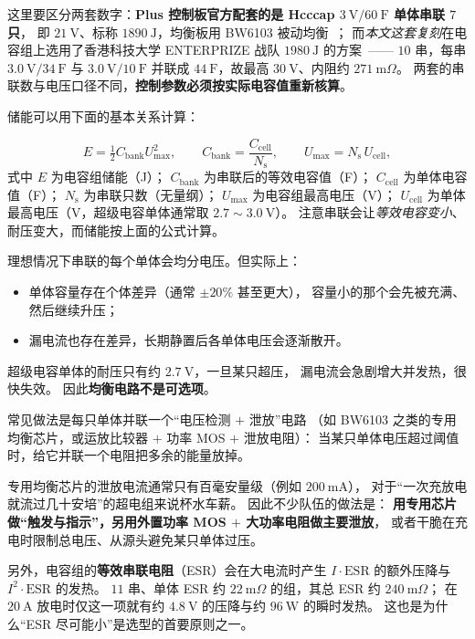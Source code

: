 \documentclass[cn,blue,11pt,device=normal]{elegantnote}
\begin{document}
这里要区分两套数字：\textbf{Plus 控制板官方配套的是
Hcccap $3\ \mathrm{V}/60\ \mathrm{F}$ 单体串联 $7$ 只}，
即 $21\ \mathrm{V}$、标称 $1890\ \mathrm{J}$，均衡板用 BW6103 被动均衡~\cite{glutplusmanual}；
而\emph{本文这套复刻}在电容组上选用了香港科技大学 ENTERPRIZE 战队
$1980\ \mathrm{J}$ 的方案~\cite{hkust1980j}——
$10$ 串，每串 $3.0\ \mathrm{V}/34\ \mathrm{F}$ 与 $3.0\ \mathrm{V}/10\ \mathrm{F}$
并联成 $44\ \mathrm{F}$，故最高 $30\ \mathrm{V}$、内阻约 $271\ \mathrm{m}\Omega$。
两套的串联数与电压口径不同，\textbf{控制参数必须按实际电容值重新核算}。

储能可以用下面的基本关系计算：

\begin{equation}\label{eq:capbank}
  E = \tfrac{1}{2}C_{\mathrm{bank}}U_{\max}^{2},
  \qquad
  C_{\mathrm{bank}} = \frac{C_{\mathrm{cell}}}{N_{\mathrm{s}}},
  \qquad
  U_{\max} = N_{\mathrm{s}}\,U_{\mathrm{cell}} ,
\end{equation}
式中 $E$ 为电容组储能（J）；
$C_{\mathrm{bank}}$ 为串联后的等效电容值（F）；
$C_{\mathrm{cell}}$ 为单体电容值（F）；
$N_{\mathrm{s}}$ 为串联只数（无量纲）；
$U_{\max}$ 为电容组最高电压（V）；
$U_{\mathrm{cell}}$ 为单体最高电压（V，超级电容单体通常取 $2.7\sim3.0\ \mathrm{V}$）。
注意串联会让\emph{等效电容变小}、耐压变大，而储能按上面的公式计算。

\begin{note}[为什么必须做均衡]
理想情况下串联的每个单体会均分电压。但实际上：
\begin{itemize}
  \item 单体容量存在个体差异（通常 $\pm20\%$ 甚至更大），
  容量小的那个会先被充满、然后继续升压；
  \item 漏电流也存在差异，长期静置后各单体电压会逐渐散开。
\end{itemize}
超级电容单体的耐压只有约 $2.7\ \mathrm{V}$，一旦某只超压，
漏电流会急剧增大并发热，很快失效。
因此\textbf{均衡电路不是可选项}。

常见做法是每只单体并联一个“电压检测 $+$ 泄放”电路
（如 BW6103 之类的专用均衡芯片，或运放比较器 $+$ 功率 MOS $+$ 泄放电阻）：
当某只单体电压超过阈值时，给它并联一个电阻把多余的能量放掉。
\end{note}

\begin{note}[均衡能力的现实]
专用均衡芯片的泄放电流通常只有百毫安量级（例如 $200\ \mathrm{mA}$），
对于“一次充放电就流过几十安培”的超电组来说杯水车薪。
因此不少队伍的做法是：
\textbf{用专用芯片做“触发与指示”，另用外置功率 MOS $+$ 大功率电阻做主要泄放}，
或者干脆在充电时限制总电压、从源头避免某只单体过压。

另外，电容组的\textbf{等效串联电阻}（ESR）会在大电流时产生
$I\!\cdot\!\mathrm{ESR}$ 的额外压降与 $I^2\!\cdot\!\mathrm{ESR}$ 的发热。
$11$ 串、单体 ESR 约 $22\ \mathrm{m}\Omega$ 的组，其总 ESR 约 $240\ \mathrm{m}\Omega$；
在 $20\ \mathrm{A}$ 放电时仅这一项就有约 $4.8\ \mathrm{V}$ 的压降与约 $96\ \mathrm{W}$ 的瞬时发热。
这也是为什么“ESR 尽可能小”是选型的首要原则之一。
\end{note}
\end{document}
